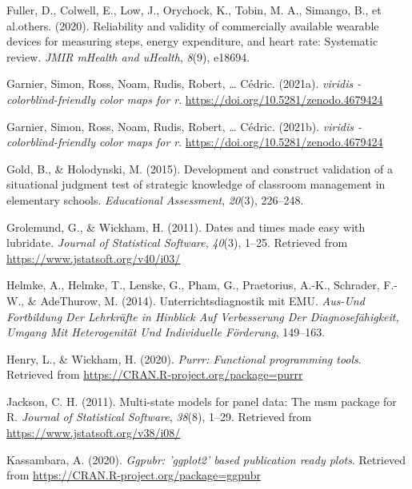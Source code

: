 \documentclass[
  man,floatsintext]{apa6}
\newlength{\cslhangindent}
\newlength{\cslentryspacingunit} %
\newenvironment{CSLReferences}[2] %
 {%
  \setlength{\parindent}{0pt}
  \ifodd #1
  \let\oldpar\par
  \def\par{\hangindent=\cslhangindent\oldpar}
  \fi
  \setlength{\parskip}{#2\cslentryspacingunit}
 }%
 {}
\begin{document}
\begin{CSLReferences}{1}{0}
\leavevmode{}%
Fuller, D., Colwell, E., Low, J., Orychock, K., Tobin, M. A., Simango, B., et al.others. (2020). Reliability and validity of commercially available wearable devices for measuring steps, energy expenditure, and heart rate: Systematic review. \emph{JMIR mHealth and uHealth}, \emph{8}(9), e18694.

\leavevmode{}%
Garnier, Simon, Ross, Noam, Rudis, Robert, \ldots{} Cédric. (2021a). \emph{{viridis} - colorblind-friendly color maps for r}. \url{https://doi.org/10.5281/zenodo.4679424}

\leavevmode{}%
Garnier, Simon, Ross, Noam, Rudis, Robert, \ldots{} Cédric. (2021b). \emph{{viridis} - colorblind-friendly color maps for r}. \url{https://doi.org/10.5281/zenodo.4679424}

\leavevmode{}%
Gold, B., \& Holodynski, M. (2015). Development and construct validation of a situational judgment test of strategic knowledge of classroom management in elementary schools. \emph{Educational Assessment}, \emph{20}(3), 226--248.

\leavevmode{}%
Grolemund, G., \& Wickham, H. (2011). Dates and times made easy with {lubridate}. \emph{Journal of Statistical Software}, \emph{40}(3), 1--25. Retrieved from \url{https://www.jstatsoft.org/v40/i03/}

\leavevmode{}%
Helmke, A., Helmke, T., Lenske, G., Pham, G., Praetorius, A.-K., Schrader, F.-W., \& AdeThurow, M. (2014). Unterrichtsdiagnostik mit EMU. \emph{Aus-Und Fortbildung Der Lehrkr{ä}fte in Hinblick Auf Verbesserung Der Diagnosef{ä}higkeit, Umgang Mit Heterogenit{ä}t Und Individuelle F{ö}rderung}, 149--163.

\leavevmode{}%
Henry, L., \& Wickham, H. (2020). \emph{Purrr: Functional programming tools}. Retrieved from \url{https://CRAN.R-project.org/package=purrr}

\leavevmode{}%
Jackson, C. H. (2011). Multi-state models for panel data: The {msm} package for {R}. \emph{Journal of Statistical Software}, \emph{38}(8), 1--29. Retrieved from \url{https://www.jstatsoft.org/v38/i08/}

\leavevmode{}%
Kassambara, A. (2020). \emph{Ggpubr: 'ggplot2' based publication ready plots}. Retrieved from \url{https://CRAN.R-project.org/package=ggpubr}


\end{CSLReferences}
\end{document}
